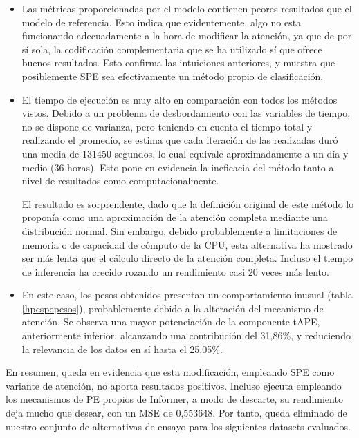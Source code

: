 \begin{itemize}
	\item Las métricas proporcionadas por el modelo contienen peores resultados que el modelo de referencia. Esto indica que evidentemente, algo no esta funcionando adecuadamente a la hora de modificar la atención, ya que de por sí sola, la codificación complementaria que se ha utilizado sí que ofrece buenos resultados. Esto confirma las intuiciones anteriores, y muestra que posiblemente SPE sea efectivamente un método propio de clasificación.
	
	\item El tiempo de ejecución es muy alto en comparación con todos los métodos vistos. Debido a un problema de desbordamiento con las variables de tiempo, no se dispone de varianza, pero teniendo en cuenta el tiempo total y realizando el promedio, se estima que cada iteración de las realizadas duró una media de $131450$ segundos, lo cual equivale aproximadamente a un día y medio (36 horas). Esto pone en evidencia la ineficacia del método tanto a nivel de resultados como computacionalmente. 
	
	El resultado es sorprendente, dado que la definición original de este método lo proponía como una aproximación de la atención completa mediante una distribución normal. Sin embargo, debido probablemente a limitaciones de memoria o de capacidad de cómputo de la CPU, esta alternativa ha mostrado ser más lenta que el cálculo directo de la atención completa. Incluso el tiempo de inferencia ha crecido rozando un rendimiento casi 20 veces más lento.
	
	\item En este caso, los pesos obtenidos presentan un comportamiento inusual (tabla \ref{hpcspepesos}), probablemente debido a la alteración del mecanismo de atención. Se observa una mayor potenciación de la componente tAPE, anteriormente inferior, alcanzando una contribución del 31,86\%, y reduciendo la relevancia de los datos en sí hasta el 25,05\%. 
	
\end{itemize}

En resumen, queda en evidencia que esta modificación, empleando SPE como variante de atención, no aporta resultados positivos. Incluso ejecuta empleando los mecanismos de PE propios de Informer, a modo de descarte, su rendimiento deja mucho que desear, con un MSE de  0,553648. Por tanto, queda eliminado de nuestro conjunto de alternativas de ensayo para los siguientes datasets evaluados.

